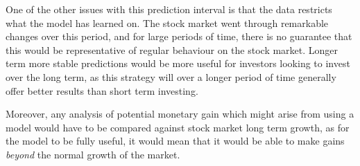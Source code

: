 One of the other issues with this prediction interval is that the data restricts what the model has learned on. The stock market went through remarkable changes over this period, and for large periods of time, there is no guarantee that this would be representative of regular behaviour on the stock market. Longer term more stable predictions would be more useful for investors looking to invest over the long term, as this strategy will over a longer period of time generally offer better results than short term investing.

Moreover, any analysis of potential monetary gain which might arise from using a model would have to be compared against stock market long term growth, as for the model to be fully useful, it would mean that it would be able to make gains \textit{beyond} the normal growth of the market.





